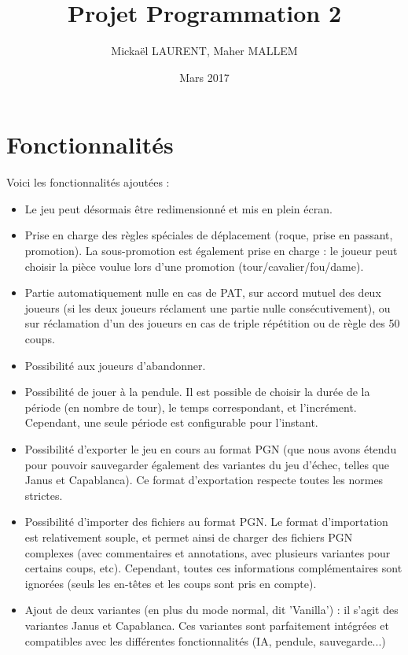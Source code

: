 \documentclass[11pt]{article}
\title{Projet Programmation 2}
\author{Mickaël LAURENT, Maher MALLEM}
\date{Mars 2017}
\begin{document}
\renewcommand{\labelitemi}{-}
\maketitle

\section{Fonctionnalités}

Voici les fonctionnalités ajoutées :\newline
\begin{itemize}
\item Le jeu peut désormais être redimensionné et mis en plein écran.

\item Prise en charge des règles spéciales de déplacement (roque, prise en passant, promotion). La sous-promotion est également prise en charge : le joueur peut choisir la pièce voulue lors d'une promotion (tour/cavalier/fou/dame).

\item Partie automatiquement nulle en cas de PAT, sur accord mutuel des deux joueurs (si les deux joueurs réclament une partie nulle consécutivement), ou sur réclamation d'un des joueurs en cas de triple répétition ou de règle des 50 coups.

\item Possibilité aux joueurs d'abandonner.

\item Possibilité de jouer à la pendule. Il est possible de choisir la durée de la période (en nombre de tour), le temps correspondant, et l'incrément. Cependant, une seule période est configurable pour l'instant.

\item Possibilité d'exporter le jeu en cours au format PGN (que nous avons étendu pour pouvoir sauvegarder également des variantes du jeu d'échec, telles que Janus et Capablanca). Ce format d'exportation respecte toutes les normes strictes.

\item Possibilité d'importer des fichiers au format PGN. Le format d'importation est relativement souple, et permet ainsi de charger des fichiers PGN complexes (avec commentaires et annotations, avec plusieurs variantes pour certains coups, etc). Cependant, toutes ces informations complémentaires sont ignorées (seuls les en-têtes et les coups sont pris en compte).

\item Ajout de deux variantes (en plus du mode normal, dit 'Vanilla') : il s'agit des variantes Janus et Capablanca. Ces variantes sont parfaitement intégrées et compatibles avec les différentes fonctionnalités (IA, pendule, sauvegarde...)


\end{itemize}
\end{document}

